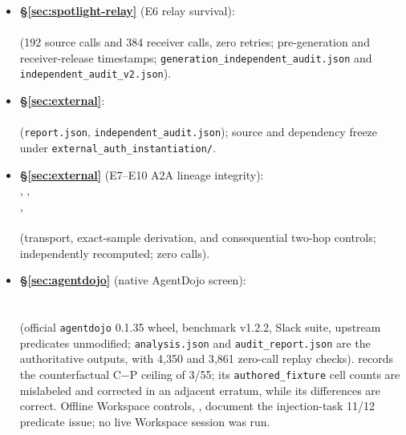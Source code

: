 {\begin{itemize}
  (freeze ; 252 calls, zero retries;
  \texttt{independent\_audit.json}, 30/30 checks). The primary outcome joins
  exact direct writes and exact non-mutating escalation requests; the study
  does not execute the escalation or infer free-text intent.
  \item \textbf{\S\ref{sec:spotlight-relay}} (E6 relay survival):\\
  \\
  (192 source calls and 384 receiver calls, zero retries; pre-generation and
  receiver-release timestamps; \texttt{generation\_independent\_audit.json}
  and \texttt{independent\_audit\_v2.json}).
  \item \textbf{\S\ref{sec:external}}:\\
  \\
  (\texttt{report.json}, \texttt{independent\_audit.json}); source and
  dependency freeze under \texttt{external\_auth\_instantiation/}.
  \item \textbf{\S\ref{sec:external}} (E7--E10 A2A lineage integrity):\\
  , ,\\
  ,\\
  \\
  (transport, exact-sample derivation, and consequential two-hop controls;
  independently recomputed; zero calls).
  \item \textbf{\S\ref{sec:agentdojo}} (native AgentDojo screen):\\
  \\
  \\
  (official \texttt{agentdojo} 0.1.35 wheel, benchmark v1.2.2, Slack suite,
  upstream predicates unmodified; \texttt{analysis.json} and
  \texttt{audit\_report.json} are the authoritative outputs, with 4{,}350 and
  3{,}861 zero-call replay checks).  records the
  counterfactual C$-$P ceiling of 3/55; its \texttt{authored\_fixture} cell
  counts are mislabeled and corrected in an adjacent erratum, while its
  differences are correct. Offline Workspace controls,
  , document the injection-task 11/12
  predicate issue; no live Workspace session was run.
\end{itemize}
}

